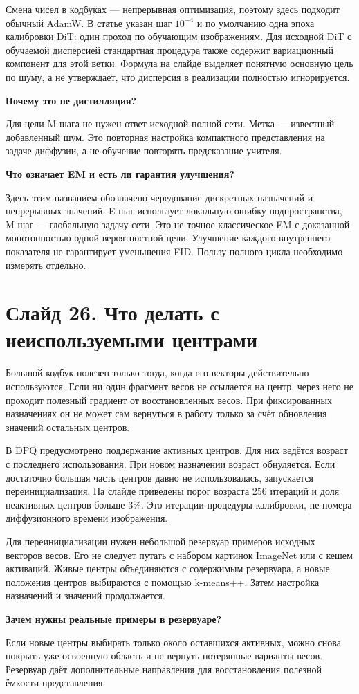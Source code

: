 \documentclass[a4paper,11pt]{article}
\newcommand{\slide}[2]{\clearpage\section*{Слайд #1. #2}}
\newcommand{\question}[1]{\par\textbf{#1}\par}
\begin{document}
Смена чисел в кодбуках --- непрерывная оптимизация,
поэтому здесь подходит обычный AdamW. В статье
указан шаг $10^{-4}$ и по умолчанию одна эпоха
калибровки DiT: один проход по обучающим изображениям.
Для исходной DiT с обучаемой дисперсией стандартная
процедура также содержит вариационный компонент
для этой ветки. Формула на слайде выделяет
понятную основную цель по шуму, а не утверждает,
что дисперсия в реализации полностью игнорируется.

\question{Почему это не дистилляция?}
Для цели M-шага не нужен ответ исходной полной сети.
Метка --- известный добавленный шум. Это повторная
настройка компактного представления на задаче диффузии,
а не обучение повторять предсказание учителя.

\question{Что означает EM и есть ли гарантия улучшения?}
Здесь этим названием обозначено чередование
дискретных назначений и непрерывных значений.
E-шаг использует локальную ошибку подпространства,
M-шаг --- глобальную задачу сети. Это не точное
классическое EM с доказанной монотонностью одной
вероятностной цели. Улучшение каждого внутреннего
показателя не гарантирует уменьшения FID.
Пользу полного цикла необходимо измерять отдельно.

\slide{26}{Что делать с неиспользуемыми центрами}
Большой кодбук полезен только тогда, когда его
векторы действительно используются. Если ни один
фрагмент весов не ссылается на центр, через него
не проходит полезный градиент от восстановленных весов.
При фиксированных назначениях он не может сам
вернуться в работу только за счёт обновления
значений остальных центров.

В DPQ предусмотрено поддержание активных центров.
Для них ведётся возраст с последнего использования.
При новом назначении возраст обнуляется.
Если достаточно большая часть центров давно
не использовалась, запускается переинициализация.
На слайде приведены порог возраста 256
итераций и доля неактивных центров больше 3\%.
Это итерации процедуры калибровки,
не номера диффузионного времени изображения.

Для переинициализации нужен небольшой резервуар
примеров исходных векторов весов. Его не следует
путать с набором картинок ImageNet или с
кешем активаций. Живые центры объединяются
с содержимым резервуара, а новые положения
центров выбираются с помощью k-means++.
Затем настройка назначений и значений продолжается.

\question{Зачем нужны реальные примеры в резервуаре?}
Если новые центры выбирать только около оставшихся
активных, можно снова покрыть уже освоенную
область и не вернуть потерянные варианты весов.
Резервуар даёт дополнительные направления для
восстановления полезной ёмкости представления.
\end{document}

